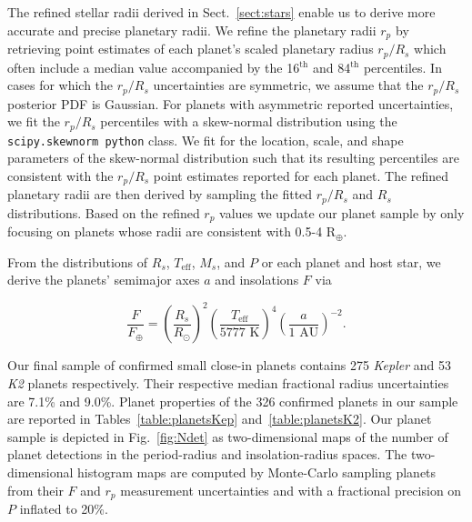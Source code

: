 \documentclass[twocolumn]{emulateapj}
\newcommand{\kepler}[1]{\emph{Kepler}#1}
\newcommand{\ktwo}[1]{\emph{K2}#1}
\newcommand{\teff}[1]{$T_{\text{eff}}$#1}
\begin{document}
The refined stellar radii derived in Sect.~\ref{sect:stars} enable us to derive more accurate and precise
planetary radii.
We refine the planetary radii $r_p$ by retrieving point estimates of each planet's scaled planetary radius
$r_p/R_s$ which often include a median value 
accompanied by the 16$^{\text{th}}$ and 84$^{\text{th}}$ percentiles. In cases for which the $r_p/R_s$ uncertainties
are symmetric, we assume that the $r_p/R_s$ posterior PDF is Gaussian. For planets with asymmetric reported
uncertainties, we fit the $r_p/R_s$ percentiles with a skew-normal distribution using the
\texttt{scipy.skewnorm python} class. We fit for the location, scale, and shape parameters of the
skew-normal distribution such that its resulting percentiles are consistent with
the $r_p/R_s$ point estimates reported for each planet. The refined planetary radii are then derived by sampling the
fitted $r_p/R_s$ and $R_s$ distributions. Based on the refined $r_p$ values we update our planet sample by
only focusing on planets whose radii are consistent with 0.5-4 R$_{\oplus}$.

From the distributions of $R_s$, \teff{,} $M_s$, and $P$ or each planet and host star, we derive the planets'
semimajor axes $a$ and insolations $F$ via

\begin{equation}
  \frac{F}{F_{\oplus}} = \left( \frac{R_s}{R_{\odot}} \right)^2  \left( \frac{T_{\text{eff}}}{5777 \text{ K}} \right)^4 \left( \frac{a}{1 \text{ AU}} \right)^{-2}.
\end{equation}

Our final sample of confirmed small close-in planets 
contains 275 \kepler{} and 53 \ktwo{} planets respectively. Their respective median fractional
radius uncertainties are 7.1\% and 9.0\%. Planet properties of the 326 confirmed planets in our sample
are reported in Tables~\ref{table:planetsKep} and~\ref{table:planetsK2}. Our planet sample is
depicted in Fig.~\ref{fig:Ndet} as two-dimensional maps of the number of planet detections in
the period-radius and insolation-radius spaces. The two-dimensional histogram maps are computed by
Monte-Carlo sampling planets from their $F$ and $r_p$
measurement uncertainties and with a fractional precision on $P$ inflated to 20\%.
\end{document}
